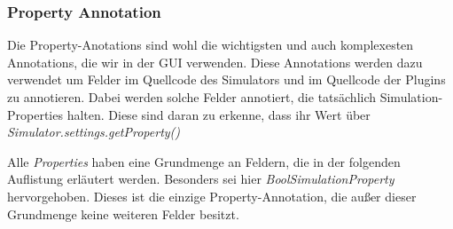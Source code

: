 \documentclass[a4paper, 11pt]{article} %
\begin{document}
\subsubsection{Property Annotation} %
\label{ssub:feld_annotation}
Die Property-Anotations sind wohl die wichtigsten und auch komplexesten Annotations, die wir in der GUI verwenden. Diese Annotations werden dazu verwendet um Felder im Quellcode des Simulators und im Quellcode der Plugins zu annotieren. Dabei werden solche Felder annotiert, die tatsächlich Simulation-Properties halten. Diese sind daran zu erkenne, dass ihr Wert über \emph{Simulator.settings.getProperty()}

Alle \emph{Properties} haben eine Grundmenge an Feldern, die in der folgenden Auflistung erläutert werden. Besonders sei hier \emph{BoolSimulationProperty} hervorgehoben. Dieses ist die einzige Property-Annotation, die außer dieser Grundmenge keine weiteren Felder besitzt.
\end{document}
